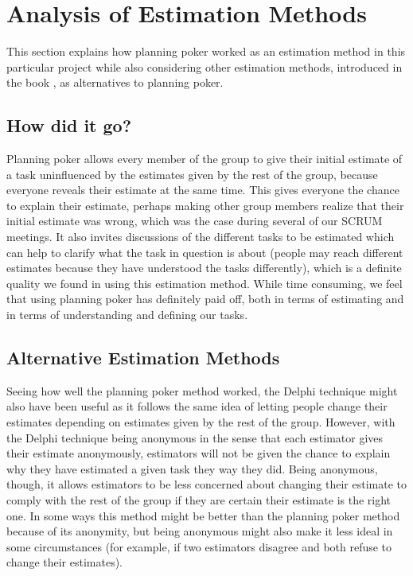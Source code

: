 \section{Analysis of Estimation Methods}
This section explains how planning poker worked as an estimation method in this particular project while also considering other estimation methods, introduced in the book \cite{caye}, as alternatives to planning poker.
\label{sec:AnalysisEstimation}
\subsection{How did it go?}
Planning poker allows every member of the group to give their initial estimate of a task uninfluenced by the estimates given by the rest of the group, because everyone reveals their estimate at the same time. This gives everyone the chance to explain their estimate, perhaps making other group members realize that their initial estimate was wrong, which was the case during several of our SCRUM meetings. It also invites discussions of the different tasks to be estimated which can help to clarify what the task in question is about (people may reach different estimates because they have understood the tasks differently), which is a definite quality we found in using this estimation method. While time consuming, we feel that using planning poker has definitely paid off, both in terms of estimating and in terms of understanding and defining our tasks.

\subsection{Alternative Estimation Methods}
Seeing how well the planning poker method worked, the Delphi technique \cite{caye} might also have been useful as it follows the same idea of letting people change their estimates depending on estimates given by the rest of the group. However, with the Delphi technique being anonymous in the sense that each estimator gives their estimate anonymously, estimators will not be given the chance to explain why they have estimated a given task they way they did. Being anonymous, though, it allows estimators to be less concerned about changing their estimate to comply with the rest of the group if they are certain their estimate is the right one. In some ways this method might be better than the planning poker method because of its anonymity, but being anonymous might also make it less ideal in some circumstances (for example, if two estimators disagree and both refuse to change their estimates).

